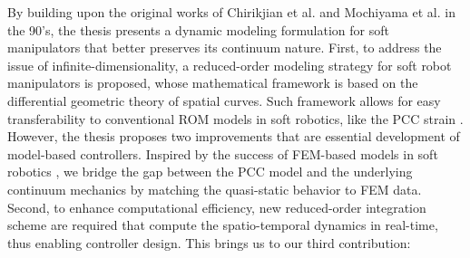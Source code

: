 By building upon the original works of Chirikjian et al. \cite{Chirikjian1992} and Mochiyama et al. \cite{Mochiyama1992} in the 90's, the thesis presents a dynamic modeling formulation for soft manipulators that better preserves its continuum nature. First, to address the issue of infinite-dimensionality, a reduced-order modeling strategy for soft robot manipulators is proposed, whose mathematical framework is based on the differential geometric theory of spatial curves. Such framework allows for easy transferability to conventional ROM models in soft robotics, like the PCC strain \cite{DellaSantina2020,Katzschmann2019,Falkenhahn2015}. However, the thesis proposes two improvements that are essential development of model-based controllers. Inspired by the success of FEM-based models in soft robotics \cite{Duriez2013,Goury2018}, we bridge the gap between the PCC model and the underlying continuum mechanics by matching the quasi-static behavior to FEM data. Second, to enhance computational efficiency, new reduced-order integration scheme are required that compute the spatio-temporal dynamics in real-time, thus enabling controller design. This brings us to our third contribution: 


